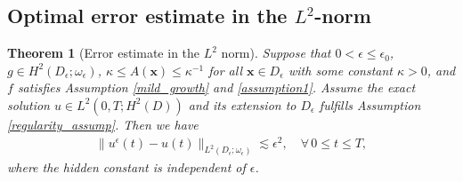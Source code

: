 \documentclass[3p,times]{elsarticle}
\newtheorem{theorem}{Theorem}[section]
\numberwithin{equation}{section}
\begin{document}
\subsection{Optimal error estimate in the $L^2$-norm}

\begin{theorem}[Error estimate in the $L^2$ norm]
	\label{thm3}
	Suppose that $0<\epsilon\leq \epsilon_0$,  $g\in H^2(D_{\epsilon};\omega_{\epsilon})$, $\kappa\leq A(\bm x)\leq \kappa^{-1}$ for all $\bm x \in D_{\epsilon}$ with some constant $\kappa>0$, and $f$ satisfies  Assumption \ref{mild_growth} and \ref{assumption1}. Assume the exact solution $u\in L^2(0,T;H^2(D))$ and its extension  to $D_\epsilon$ fulfills Assumption  \ref{regularity_assump}. Then we have
	\begin{equation}
		\label{thm3-1}
		\begin{split}
			\|u^{\epsilon}(t)-u(t)\|_{L^2(D_{\epsilon};\omega_{\epsilon})}\lesssim \epsilon^2, \quad \forall \,0\leq t \leq T,
		\end{split}
	\end{equation}
	where the hidden constant is independent of $\epsilon$.
\end{theorem}
\end{document}

